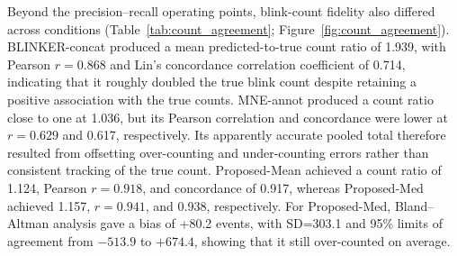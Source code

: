 Beyond the precision--recall operating points, blink-count fidelity also differed across conditions (Table~\ref{tab:count_agreement}; Figure~\ref{fig:count_agreement}). BLINKER-concat produced a mean predicted-to-true count ratio of 1.939, with Pearson $r=0.868$ and Lin's concordance correlation coefficient of 0.714, indicating that it roughly doubled the true blink count despite retaining a positive association with the true counts. MNE-annot produced a count ratio close to one at 1.036, but its Pearson correlation and concordance were lower at $r=0.629$ and 0.617, respectively. Its apparently accurate pooled total therefore resulted from offsetting over-counting and under-counting errors rather than consistent tracking of the true count. Proposed-Mean achieved a count ratio of 1.124, Pearson $r=0.918$, and concordance of 0.917, whereas Proposed-Med achieved 1.157, $r=0.941$, and 0.938, respectively. For Proposed-Med, Bland--Altman analysis gave a bias of +80.2 events, with SD=303.1 and 95\% limits of agreement from $-513.9$ to $+674.4$, showing that it still over-counted on average.

